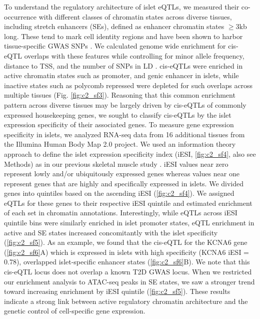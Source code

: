To understand the regulatory architecture of islet eQTLs, we measured their co-occurrence with different classes of chromatin states across diverse tissues, including stretch enhancers (SEs), defined as enhancer chromatin states $\geq$3kb long. These tend to mark cell identity regions and have been shown to harbor tissue-specific GWAS SNPs \cite{parkerChromatinStretchEnhancer2013, quangMotifSignaturesStretch2015}. We calculated genome wide enrichment for cis-eQTL overlaps with these features while controlling for minor allele frequency, distance to TSS, and the number of SNPs in LD \cite{schmidtGREGOREvaluatingGlobal2015}. cis-eQTLs were enriched in active chromatin states such as promoter, and genic enhancer in islets, while inactive states such as polycomb repressed were depleted for such overlaps across multiple tissues (Fig. \ref{fig:c2_sf3}). Reasoning that this common enrichment pattern across diverse tissues may be largely driven by cis-eQTLs of commonly expressed housekeeping genes, we sought to classify cis-eQTLs by the islet expression specificity of their associated genes. To measure gene expression specificity in islets, we analyzed RNA-seq data from 16 additional tissues from the Illumina Human Body Map 2.0 project. We used an information theory approach to define the islet expression specificity index (iESI, \ref{fig:c2_sf4}, also see Methods) as in our previous skeletal muscle study \cite{scottGeneticRegulatorySignature2016}. iESI values near zero represent lowly and/or ubiquitously expressed genes whereas values near one represent genes that are highly and specifically expressed in islets. We divided genes into quintiles based on the ascending iESI (\ref{fig:c2_sf4}). We assigned eQTLs for these genes to their respective iESI quintile and estimated enrichment of each set in chromatin annotations. Interestingly, while eQTLs across iESI quintile bins were similarly enriched in islet promoter states, eQTL enrichment in active and SE states increased concomitantly with the islet specificity (\ref{fig:c2_sf5}). As an example, we found that the cis-eQTL for the KCNA6 gene (\ref{fig:c2_sf6}A) which is expressed in islets with high specificity (KCNA6 iESI = 0.78), overlapped islet-specific enhancer states (\ref{fig:c2_sf6}B). We note that this cis-eQTL locus does not overlap a known T2D GWAS locus. When we restricted our enrichment analysis to ATAC-seq peaks in SE states, we saw a stronger trend toward increasing enrichment by iESI quintile (\ref{fig:c2_sf5}). These results indicate a strong link between active regulatory chromatin architecture and the genetic control of cell-specific gene expression.

